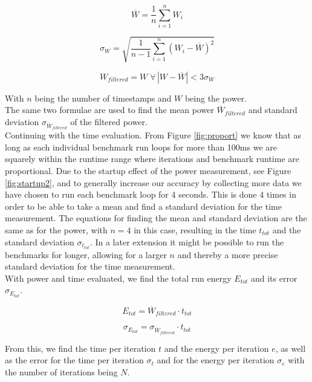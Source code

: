 \documentclass[conference]{IEEEtran}
\begin{document}
\begin{equation}
\overline{W} = \frac{1}{n} \sum_{i=1}^{n} W_i
\end{equation}

\begin{equation}
\sigma_W = \sqrt{\frac{1}{n - 1} \sum_{i=1}^{n} (W_i - \overline{W})^2}
\end{equation}

\begin{equation}
W_{filtered} = W \; \forall \, |W - \overline{W}| < 3 \sigma_W
\end{equation}

With \( n \) being the number of timestamps and \( W \) being the power. \\
The same two formulae are used to find the mean power \( \overline{W}_{filtered} \) and standard deviation \( \sigma_{\overline{W}_{filtered}} \) of the filtered power. \\
Continuing with the time evaluation. From Figure \ref{fig:proport} we know that as long as each individual benchmark run loops for more than 100ms we are squarely within the runtime range where iterations and benchmark runtime are proportional. Due to the startup effect of the power measurement, see Figure \ref{fig:startup2}, and to generally increase our accuracy by collecting more data we have chosen to run each benchmark loop for 4 seconds. This is done 4 times in order to be able to take a mean and find a standard deviation for the time measurement. The equations for finding the mean and standard deviation are the same as for the power, with $n=4$ in this case, resulting in the time \(t_{tot}\) and the standard deviation \(\sigma_{t_{tot}}\). In a later extension it might be possible to run the benchmarks for longer, allowing for a larger $n$ and thereby a more precise standard deviation for the time measurement. \\
With power and time evaluated, we find the total run energy \( E_{tot} \) and its error \( \sigma_{E_{tot}} \).

\begin{equation}
E_{tot} = \overline{W}_{filtered} \cdot t_{tot}
\end{equation}

\begin{equation}
\sigma_{E_{tot}} = \sigma_{\overline{W}_{filtered}} \cdot t_{tot}
\end{equation}

From this, we find the time per iteration \( t \) and the energy per iteration \( e \), as well as the error for the time per iteration \( \sigma_t \) and for the energy per iteration \( \sigma_e \) with the number of iterations being \( N \).
\end{document}
